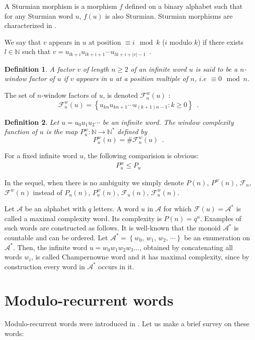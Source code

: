 \documentclass[a4 paper,12pt]{article}
\newtheorem{definition}{Definition}[section]
\begin{document}
A Sturmian morphism is a morphism $f$ defined on a binary alphabet such that for any Sturmian word $u$, $f(u)$ is also Sturmian. Sturmian morphisms are characterized in \cite{berst-seeb}.

We say that $v$ appears in $u$ at   position $\equiv i\mod k$ ($i$ modulo $k$) if there exists $l\in \mathbb{N}$ such that $v=u_{lk+i}  u_{lk+i+1}\cdots u_{lk+i+|v|-1}$~.

\begin{definition}
A factor $v$  of length  $n\geq 2$ of an infinite word $u$ is said to be a $n$-window factor of $u$ if $v$  appears in $u$ at a position  multiple of $n$, $i.e$ $\equiv 0\mod n$. \end{definition} 

 The set of $n$-window  factors of $u$, is denoted  $\mathcal{F}^{w}_n(u)$ : 
$$\mathcal{F}^{w}_n(u)=\left\{u_{kn}u_{kn+1}\cdots u_{(k+1)n-1}: k\geq 0\right\}\enspace.$$

\begin{definition} Let $u=u_0u_1u_2\cdots$ be an infinite word. The window complexity function of $u$ is the map $P^{w}_{u}: \mathbb{N}\longrightarrow \mathbb{N}^*$ defined by
$$P^{w}_{u}(n)=\# \mathcal{F}^{w}_n(u) \enspace.$$
\end{definition}

For a fixed infinite word $u$, the following comparision is obvious:
\begin{eqnarray}
 P^{w}_{u}\leq P_{u} \label{Pf<=P}
\end{eqnarray}

In the sequel, when there is no ambiguity we simply  denote $P(n)$, $P^w(n)$, $\mathcal{F}_{n}$, $\mathcal{F}^{w}(n)$ instead of  $P_u(n)$, $P^{w}_{u}(n)$, $\mathcal{F}_{u}(n)$,  $\mathcal{F}^{w}_{u}(n)$. 

Let $\mathcal{A}$ be an alphabet with $q$ letters. A word $u$ in $\mathcal{A}$ for which $\mathcal{F}(u)=\mathcal{A}^{*}$ is called a maximal complexity word. Its complexity is $P(n) =q^n$. Examples of such words are constructed as follows.  It is well-known that the monoid $\mathcal{A}^{*}$ is countable and can be ordered. Let $\mathcal{A}^{*}=\left\{w_0,\, w_1,\, w_2,\,\cdots\right\}$ be an enumeration on $\mathcal{A}^{*}$. Then, the infinite word $u=w_0w_1w_2w_3\ldots$, obtained by concatenating all words $w_i$,  is called Champernowne word and it has maximal  complexity, since by construction every word in $\mathcal{A}^{*}$ occurs in it.


\section{Modulo-recurrent words}
Modulo-recurrent words were introduced in \cite{12}. 
Let us make a brief survey on these words:
\end{document}
